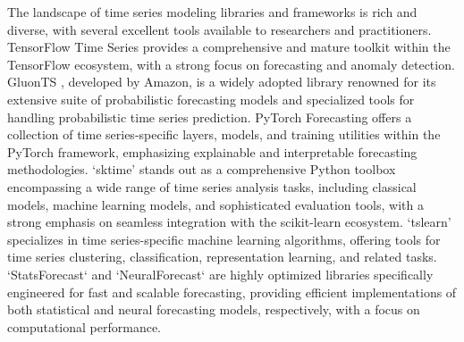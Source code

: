 \documentclass[twoside,11pt]{article}
\begin{document}
The landscape of time series modeling libraries and frameworks is rich and diverse, with several excellent tools available to researchers and practitioners. TensorFlow Time Series \citep{abadi2016tensorflow} provides a comprehensive and mature toolkit within the TensorFlow ecosystem, with a strong focus on forecasting and anomaly detection.  GluonTS \citep{alexandrov2020gluonts}, developed by Amazon, is a widely adopted library renowned for its extensive suite of probabilistic forecasting models and specialized tools for handling probabilistic time series prediction.  PyTorch Forecasting \citep{paszke2019pytorch} offers a collection of time series-specific layers, models, and training utilities within the PyTorch framework, emphasizing explainable and interpretable forecasting methodologies.  `sktime' \citep{loning2019sktime} stands out as a comprehensive Python toolbox encompassing a wide range of time series analysis tasks, including classical models, machine learning models, and sophisticated evaluation tools, with a strong emphasis on seamless integration with the scikit-learn ecosystem.  `tslearn' \citep{tavenard2020tslearn} specializes in time series-specific machine learning algorithms, offering tools for time series clustering, classification, representation learning, and related tasks.  `StatsForecast` \citep{garza2022statsforecast} and `NeuralForecast` \citep{olivares2022library_neuralforecast} are highly optimized libraries specifically engineered for fast and scalable forecasting, providing efficient implementations of both statistical and neural forecasting models, respectively, with a focus on computational performance.
\end{document}
